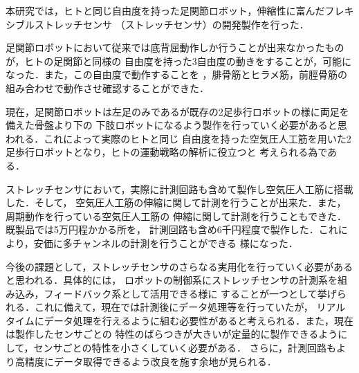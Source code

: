 本研究では，ヒトと同じ自由度を持った足関節ロボット，伸縮性に富んだフレキシブルストレッチセンサ
（ストレッチセンサ）の開発製作を行った．

足関節ロボットにおいて従来では底背屈動作しか行うことが出来なかったものが，ヒトの足関節と同様の
自由度を持った3自由度の動きをすることが，可能になった．また，この自由度で動作することを
，腓骨筋とヒラメ筋，前脛骨筋の組み合わせで動作させ確認することができた．

現在，足関節ロボットは左足のみであるが既存の2足歩行ロボットの様に両足を備えた骨盤より下の
下肢ロボットになるよう製作を行っていく必要があると思われる．これによって実際のヒトと同じ
自由度を持った空気圧人工筋を用いた2足歩行ロボットとなり，ヒトの運動戦略の解析に役立つと
考えられる為である．

ストレッチセンサにおいて，実際に計測回路も含めて製作し空気圧人工筋に搭載した．そして，
空気圧人工筋の伸縮に関して計測を行うことが出来た．また，周期動作を行っている空気圧人工筋の
伸縮に関して計測を行うこともできた．既製品では5万円程かかる所を，
計測回路も含め6千円程度で製作した．これにより，安価に多チャンネルの計測を行うことができる
様になった．

今後の課題として，ストレッチセンサのさらなる実用化を行っていく必要があると思われる．具体的には，
ロボットの制御系にストレッチセンサの計測系を組み込み，フィードバック系として活用できる様に
することが一つとして挙げられる．これに備えて，現在では計測後にデータ処理等を行っていたが，
リアルタイムにデータ処理を行えるように組む必要性があると考えられる．また，現在は製作したセンサごとの
特性のばらつきが大きいが定量的に製作できるようにして，センサごとの特性を小さくしていく必要がある．
さらに，計測回路もより高精度にデータ取得できるよう改良を施す余地が見られる．
